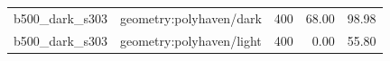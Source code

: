 \begin{longtable}{l>{\raggedright\arraybackslash}p{.42\linewidth}rrr}
b500\_\allowbreak{}dark\_\allowbreak{}s303 & %
geometry:polyhaven/dark & %
400 & %
68.00 & %
98.98 \\ %

b500\_\allowbreak{}dark\_\allowbreak{}s303 & %
geometry:polyhaven/light & %
400 & %
0.00 & %
55.80 \\ %


\end{longtable}
